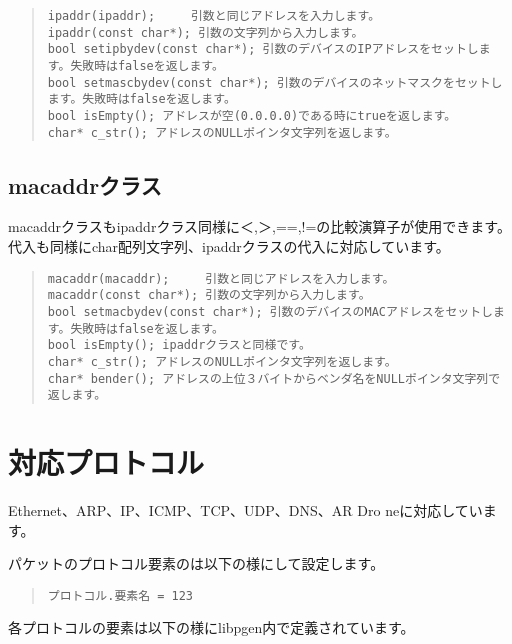 \documentclass[12pt]{jsarticle}
\begin{document}
\begin{quote}
\begin{verbatim}
ipaddr(ipaddr);     引数と同じアドレスを入力します。
ipaddr(const char*); 引数の文字列から入力します。
bool setipbydev(const char*); 引数のデバイスのIPアドレスをセットします。失敗時はfalseを返します。
bool setmascbydev(const char*); 引数のデバイスのネットマスクをセットします。失敗時はfalseを返します。
bool isEmpty(); アドレスが空(0.0.0.0)である時にtrueを返します。
char* c_str(); アドレスのNULLポインタ文字列を返します。
\end{verbatim}
\end{quote}


\subsection{macaddrクラス}                    	
macaddrクラスもipaddrクラス同様に＜,＞,==,!=の比較演算子が使用できます。
代入も同様にchar配列文字列、ipaddrクラスの代入に対応しています。

\begin{quote}
\begin{verbatim}
macaddr(macaddr);     引数と同じアドレスを入力します。
macaddr(const char*); 引数の文字列から入力します。
bool setmacbydev(const char*); 引数のデバイスのMACアドレスをセットします。失敗時はfalseを返します。
bool isEmpty(); ipaddrクラスと同様です。
char* c_str(); アドレスのNULLポインタ文字列を返します。
char* bender(); アドレスの上位３バイトからベンダ名をNULLポインタ文字列で返します。
\end{verbatim}
\end{quote}





\newpage
\section{対応プロトコル}                      	
Ethernet、ARP、IP、ICMP、TCP、UDP、DNS、AR Dro	neに対応しています。

パケットのプロトコル要素のは以下の様にして設定します。
\begin{quote}
\begin{verbatim}
プロトコル.要素名 = 123
\end{verbatim}
\end{quote}

各プロトコルの要素は以下の様にlibpgen内で定義されています。
\end{document}
